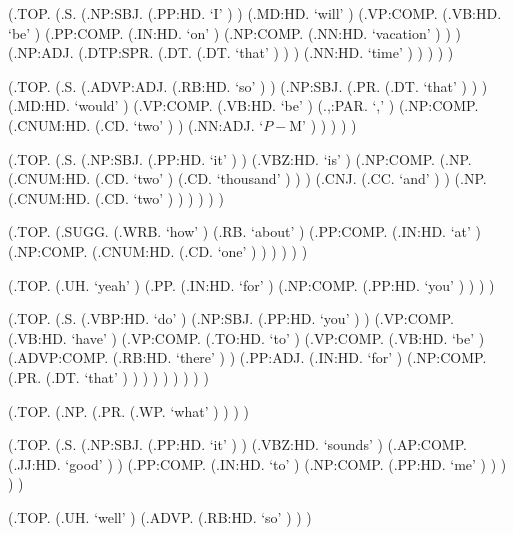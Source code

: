 \documentclass[10pt]{article}
\begin{document}
\begin{parsetree}  (.TOP. (.S. (.NP:SBJ. (.PP:HD. `I' ) ) (.MD:HD. `will' ) (.VP:COMP. (.VB:HD. `be' ) (.PP:COMP. (.IN:HD. `on' ) (.NP:COMP. (.NN:HD. `vacation' ) ) ) (.NP:ADJ. (.DTP:SPR. (.DT. (.DT. `that' ) ) ) (.NN:HD. `time' ) ) ) ) ) \end{parsetree}

\begin{parsetree}  (.TOP. (.S. (.ADVP:ADJ. (.RB:HD. `so' ) ) (.NP:SBJ. (.PR. (.DT. `that' ) ) ) (.MD:HD. `would' ) (.VP:COMP. (.VB:HD. `be' ) (.,:PAR. `,' ) (.NP:COMP. (.CNUM:HD. (.CD. `two' ) ) (.NN:ADJ. `$P-$M' ) ) ) ) ) \end{parsetree}

\begin{parsetree}  (.TOP. (.S. (.NP:SBJ. (.PP:HD. `it' ) ) (.VBZ:HD. `is' ) (.NP:COMP. (.NP. (.CNUM:HD. (.CD. `two' ) (.CD. `thousand' ) ) ) (.CNJ. (.CC. `and' ) ) (.NP. (.CNUM:HD. (.CD. `two' ) ) ) ) ) ) \end{parsetree}

\begin{parsetree}  (.TOP. (.SUGG. (.WRB. `how' ) (.RB. `about' ) (.PP:COMP. (.IN:HD. `at' ) (.NP:COMP. (.CNUM:HD. (.CD. `one' ) ) ) ) ) ) \end{parsetree}

\begin{parsetree}  (.TOP. (.UH. `yeah' ) (.PP. (.IN:HD. `for' ) (.NP:COMP. (.PP:HD. `you' ) ) ) ) \end{parsetree}

\begin{parsetree}  (.TOP. (.S. (.VBP:HD. `do' ) (.NP:SBJ. (.PP:HD. `you' ) ) (.VP:COMP. (.VB:HD. `have' ) (.VP:COMP. (.TO:HD. `to' ) (.VP:COMP. (.VB:HD. `be' ) (.ADVP:COMP. (.RB:HD. `there' ) ) (.PP:ADJ. (.IN:HD. `for' ) (.NP:COMP. (.PR. (.DT. `that' ) ) ) ) ) ) ) ) ) \end{parsetree}

\begin{parsetree}  (.TOP. (.NP. (.PR. (.WP. `what' ) ) ) ) \end{parsetree}

\begin{parsetree}  (.TOP. (.S. (.NP:SBJ. (.PP:HD. `it' ) ) (.VBZ:HD. `sounds' ) (.AP:COMP. (.JJ:HD. `good' ) ) (.PP:COMP. (.IN:HD. `to' ) (.NP:COMP. (.PP:HD. `me' ) ) ) ) ) \end{parsetree}

\begin{parsetree}  (.TOP. (.UH. `well' ) (.ADVP. (.RB:HD. `so' ) ) ) \end{parsetree}
\end{document}
